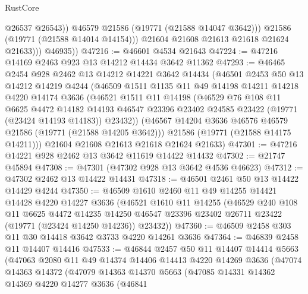 \begin{lexlean}{RustCore}
\begin{coremodule}
                      @26537
                      @26543))
                  @46579
                  @21586
                  (@19771 (@21588 @14047 @3642)))
                @21586
                (@19771 (@21588 @14014 @14154)))
              @21604
              @21608
              @21613
              @21618
              @21624
              @21633)))
        @46935))
@47216 := @46601 @4534 @21643
@47224 := @47216 @14169 @2463 @923 @13 @14212 @14434 @3642 @11362
@47293 := @46465
    @2454
    @928
    @2462
    @13
    @14212
    @14221
    @3642
    @14434
    (@46501
      @2453
      @50
      @13
      @14212
      @14219
      @4244
      (@46509
        @1511
        @1135
        @11
        @49
        @14198
        @14211
        @14218
        @4220
        @14174
        @3636
        (@46521
          @1511
          @11
          @14198
          (@46529
            @76
            @108
            @11
            @6625
            @4472
            @14182
            @14193
            @46547
            @23396
            @23402
            @24585
            @23422
            (@19771 (@23424 @14193 @14183))
            @23432))
        (@46567 @14204 @3636 @46576 @46579 @21586 (@19771 (@21588 @14205 @3642)))
        @21586
        (@19771 (@21588 @14175 @14211)))
      @21604
      @21608
      @21613
      @21618
      @21624
      @21633)
@47301 := @47216 @14221 @928 @2462 @13 @3642 @11619 @14422 @14432
@47302 := @21747 @45894
@47308 := @47301 (@47302 @928 @13 @3642 @4536 @46623)
@47312 := @47302 @2462 @13 @14422 @14431
@47318 := @46501 @2461 @50 @13 @14422 @14429 @4244
@47350 := @46509
    @1610
    @2460
    @11
    @49
    @14255
    @14421
    @14428
    @4220
    @14227
    @3636
    (@46521
      @1610
      @11
      @14255
      (@46529
        @240
        @108
        @11
        @6625
        @4472
        @14235
        @14250
        @46547
        @23396
        @23402
        @26711
        @23422
        (@19771 (@23424 @14250 @14236))
        @23432))
@47360 := @46509 @2458 @303 @11 @30 @14418 @3642 @3733 @4220 @14261 @3636
@47364 := @46839 @2458 @11 @14407 @14416
@47533 := @46844
    @2457
    @50
    @11
    @14407
    @14414
    @5663
    (@47063
      @2080
      @11
      @49
      @14374
      @14406
      @14413
      @4220
      @14269
      @3636
      (@47074
        @14363
        @14372
        (@47079
          @14363
          @14370
          @5663
          (@47085
            @14331
            @14362
            @14369
            @4220
            @14277
            @3636
            (@46841

\end{coremodule}
\end{lexlean}
